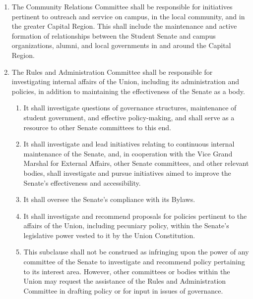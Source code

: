\documentclass{uniondoc}
\begin{document}
\begin{enumerate}
\begin{enumerate}
		      \item It shall be responsible for historical cataloging of documents and information for a digital Student Government archive.
		      \item It shall be responsible for investigating the status of technology and digital infrastructure operated by the Union,
		            and recommend policies pertinent to those areas to the Senate.
	      \end{enumerate}
	\item The Community Relations Committee shall be responsible for initiatives pertinent to outreach and service on campus, in the local community, and in the greater Capital Region.
	      This shall include the maintenance and active formation of relationships between the Student Senate and campus organizations, alumni, and local governments in and around the Capital Region.
	\item The Rules and Administration Committee shall be responsible for investigating internal affairs of the Union, including its administration and policies, in addition to maintaining the effectiveness of the Senate as a body.
	      \begin{enumerate}
		      \item It shall investigate questions of governance structures, maintenance of student government, and effective policy-making,
		            and shall serve as a resource to other Senate committees to this end.
		      \item It shall investigate and lead initiatives relating to continuous internal maintenance of the Senate,
		            and, in cooperation with the Vice Grand Marshal for External Affairs, other Senate committees, and other relevant bodies, shall investigate and pursue initiatives aimed to improve the Senate’s effectiveness and accessibility.
		      \item It shall oversee the Senate’s compliance with its Bylaws.
		      \item It shall investigate and recommend proposals for policies pertinent to the affairs of the Union, including pecuniary policy, within the Senate’s legislative power vested to it by the Union Constitution.
		      \item This subclause shall not be construed as infringing upon the power of any committee of the Senate to investigate and recommend policy pertaining to its interest area.
		            However, other committees or bodies within the Union may request the assistance of the Rules and Administration Committee in drafting policy or for input in issues of governance.

\end{enumerate}
\end{enumerate}
\end{document}
